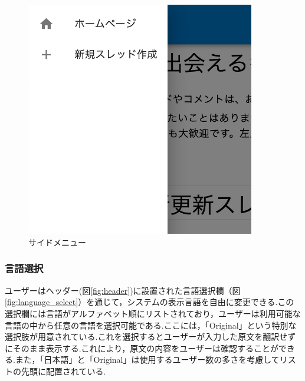 \documentclass[b5paper,12pt,dvipdfmx]{jsreport}
\begin{document}
\begin{figure}[H]
	\centering
    \includegraphics[width=100mm,height=103.02mm]{./img/feature/side_menu.png}
	\caption{サイドメニュー}
	\label{fig:side_menu}
\end{figure}


\subsubsection{言語選択}
ユーザーはヘッダー(図\ref{fig:header})に設置された言語選択欄（図\ref{fig:language_select}）を通じて，システムの表示言語を自由に変更できる.この選択欄には言語がアルファベット順にリストされており，ユーザーは利用可能な言語の中から任意の言語を選択可能である.ここには，「Original」という特別な選択肢が用意されている.これを選択するとユーザーが入力した原文を翻訳せずにそのまま表示する.これにより，原文の内容をユーザーは確認することができる.また，「日本語」と「Original」は使用するユーザー数の多さを考慮してリストの先頭に配置されている.

\end{document}
